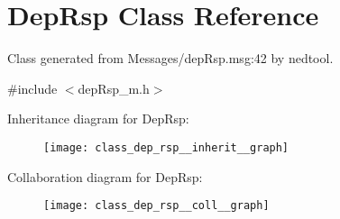 \hypertarget{class_dep_rsp}{}\section{Dep\+Rsp Class Reference}
\label{class_dep_rsp}


Class generated from {\ttfamily Messages/dep\+Rsp.\+msg\+:42} by nedtool.  




{\ttfamily \#include $<$dep\+Rsp\+\_\+m.\+h$>$}



Inheritance diagram for Dep\+Rsp\+:\nopagebreak
\begin{figure}[H]
\begin{center}
\leavevmode
\texttt{[image: class\_dep\_rsp\_\_inherit\_\_graph]}
\end{center}
\end{figure}


Collaboration diagram for Dep\+Rsp\+:\nopagebreak
\begin{figure}[H]
\begin{center}
\leavevmode
\texttt{[image: class\_dep\_rsp\_\_coll\_\_graph]}
\end{center}
\end{figure}
